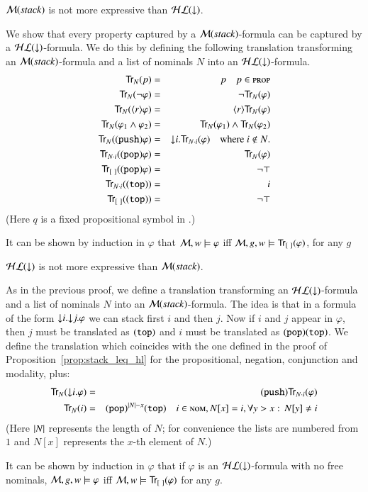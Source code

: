 \begin{pro}\label{prop:stack_leq_hl}
$\mathcal{M}(stack)$ is not more expressive than $\mathcal{HL}({\downarrow})$.
\end{pro}

\begin{pf}
We show that every property captured by a $\mathcal{M}(stack)$-formula can be
captured by a $\mathcal{HL}({\downarrow})$-formula. We do this by defining the
following translation transforming an $\mathcal{M}(stack)$-formula and a list of
nominals $N$ into an $\mathcal{HL}({\downarrow})$-formula.
\begin{eqnarray*}
{\sf Tr}_N(p) & = & p \quad p \in \textsc{prop}\\
{\sf Tr}_N(\lnot \varphi) & = & \lnot {\sf Tr}_N(\varphi) \\
{\sf Tr}_N(\langle r \rangle \varphi) & = & \langle r \rangle {\sf Tr}_N(\varphi) \\
{\sf Tr}_N(\varphi_1 \land \varphi_2) & = & {\sf Tr}_N(\varphi_1) \land {\sf Tr}_N(\varphi_2)\\
{\sf Tr}_N({\tt (push)} \varphi) & = & {\downarrow} i. {\sf Tr}_{N\cdot i}(\varphi) \quad
\textrm{where $i \notin N$.}\\
{\sf Tr}_{N\cdot i}({\tt (pop)} \varphi) & = & {\sf Tr}_{N}(\varphi)\\
{\sf Tr}_{[\ ]}({\tt (pop)} \varphi) & = & \lnot\top\\
{\sf Tr}_{N\cdot i}({\tt (top)}) & = & i\\
{\sf Tr}_{[\ ]}({\tt (top)}) & = & \lnot\top
\end{eqnarray*}
(Here $q$ is a fixed propositional symbol in \prop.)

It can be shown by induction in $\varphi$ that $\mathcal{M}, w \models
\varphi$ iff $\mathcal{M}, g, w \models {\sf Tr}_{[\ ]}(\varphi)$, for any $g$
\end{pf}

\begin{pro} \label{prop:hl_leq_stack}
$\mathcal{HL}({\downarrow})$ is not more expressive than $\mathcal{M}(stack)$.
\end{pro}

\begin{pf}
As in the previous proof, we define a translation transforming an
$\mathcal{HL}({\downarrow})$-formula and a list of nominals $N$ into an $\mathcal{M}(stack)$-formula.
The idea is that in a formula of the form ${\downarrow} i.{\downarrow} j.\varphi$
we can stack first $i$ and then $j$. Now if $i$ and $j$ appear in
$\varphi$, then $j$ must be translated as ${\tt (top)}$ and  $i$ must be
translated as ${\tt (pop)}{\tt (top)}$. We define the translation which coincides
with the one defined in the proof of
Proposition~\ref{prop:stack_leq_hl} for the propositional, negation,
conjunction and modality, plus:
\begin{eqnarray*}
{\sf Tr}_N({\downarrow} i.\varphi) & = & {\tt (push)}{\sf Tr}_{N\cdot i}(\varphi)\\
{\sf Tr}_N(i) & = & {\tt (pop)}^{|N|-x}{\tt (top)} \quad i \in \textsc{nom}, N[x]=i,
\forall y>x:\, N[y]\not=i
\end{eqnarray*}
(Here $|N|$ represents the length of $N$; for convenience the
lists are numbered from $1$ and $N[x]$ represents the $x$-th element
of $N$.)

It can be shown by induction in $\varphi$ that if $\varphi$ is an
$\mathcal{HL}({\downarrow})$-formula with no free nominals, $\mathcal{M}, g, w \models
\varphi$ iff $\model, w \models \Tr_{[\ ]}(\varphi)$ for any $g$.
\end{pf}

